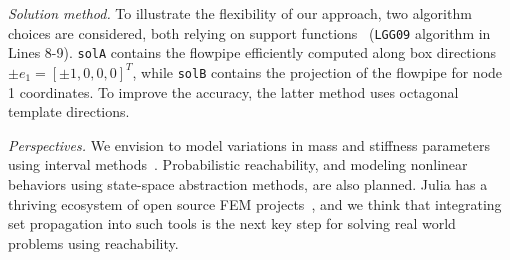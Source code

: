 \documentclass{juliacon}
\begin{document}
\noindent \emph{Solution method.} To illustrate the flexibility of our approach, two algorithm choices are considered, both relying on support functions~\cite{LeGuernic2010250} (\texttt{LGG09} algorithm in Lines 8-9).
%
\texttt{solA} contains the flowpipe efficiently computed along box directions $\pm e_1 = [\pm 1, 0, 0, 0]^T$, while \texttt{solB} contains the projection of the flowpipe for node 1 coordinates. To improve the accuracy, the latter method uses octagonal template directions.

\vspace{0.2cm}

\noindent \emph{Perspectives.} We envision to model variations in mass and stiffness parameters using interval methods~\cite{forets2021intervalmat, ferranti2021interval}.
%
Probabilistic reachability, and modeling nonlinear behaviors using state-space abstraction methods, are also planned.
%
Julia has a thriving ecosystem of open source FEM projects~\cite{Gridap,Ferrite,FinEtools}, and we think that integrating set propagation into such tools is the next key step for solving real world problems using reachability.


	
\end{document}
